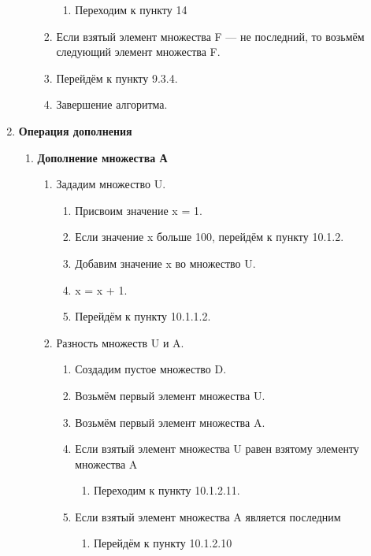 \documentclass[a4paper,12pt]{extarticle}
\begin{document}
\begin{enumerate}
\begin{enumerate}[label*=\arabic*.]
\begin{enumerate}[label*=\arabic*.]
\begin{enumerate}[label*=\arabic*.]
        \item Переходим к пункту 14
      \end{enumerate}
      \item Если взятый элемент множества F — не последний, то возьмём следующий элемент множества F.
      \item Перейдём к пункту 9.3.4.
      \item Завершение алгоритма.
    \end{enumerate}
  \end{enumerate}
  \item \textbf{Операция дополнения}
  \begin{enumerate}[label*=\arabic*.]
    \item \textbf{Дополнение множества А}
    \begin{enumerate}[label*=\arabic*.]
      \item Зададим множество U.
      \begin{enumerate}[label*=\arabic*.]
        \item Присвоим значение x = 1.
        \item Если значение x больше 100, перейдём к пункту 10.1.2.
        \item Добавим значение x во множество U.
        \item x = x + 1.
        \item Перейдём к пункту 10.1.1.2.
      \end{enumerate}
      \item Разность множеств U и A.
      \begin{enumerate}[label*=\arabic*.]
        \item Создадим пустое множество D.
        \item Возьмём первый элемент множества U.
        \item Возьмём первый элемент множества A.
        \item Если взятый элемент множества U равен взятому элементу множества A
        \begin{enumerate}[label*=\arabic*.]
          \item Переходим к пункту 10.1.2.11.
        \end{enumerate}
        \item Если взятый элемент множества A является последним
        \begin{enumerate}[label*=\arabic*.]
          \item Перейдём к пункту 10.1.2.10
        \end{enumerate}

\end{enumerate}
\end{enumerate}
\end{enumerate}
\end{enumerate}
\end{document}
